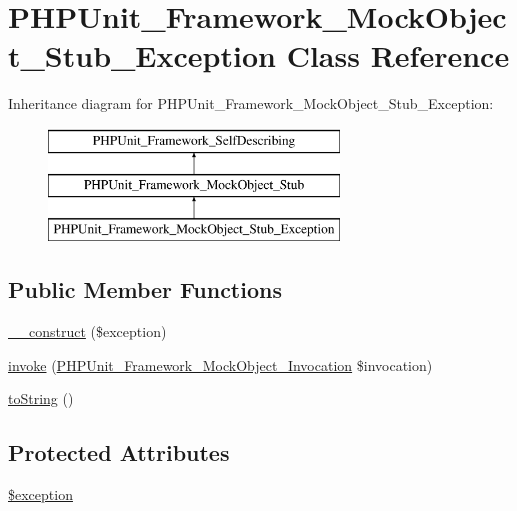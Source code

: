 \hypertarget{class_p_h_p_unit___framework___mock_object___stub___exception}{}\section{P\+H\+P\+Unit\+\_\+\+Framework\+\_\+\+Mock\+Object\+\_\+\+Stub\+\_\+\+Exception Class Reference}
\label{class_p_h_p_unit___framework___mock_object___stub___exception}
Inheritance diagram for P\+H\+P\+Unit\+\_\+\+Framework\+\_\+\+Mock\+Object\+\_\+\+Stub\+\_\+\+Exception\+:\begin{figure}[H]
\begin{center}
\leavevmode
\includegraphics[height=3.000000cm]{class_p_h_p_unit___framework___mock_object___stub___exception}
\end{center}
\end{figure}
\subsection*{Public Member Functions}
\begin{DoxyCompactItemize}
\item 
\mbox{\hyperlink{class_p_h_p_unit___framework___mock_object___stub___exception_a62d6fa9ad1594191d3535672297352ad}{\+\_\+\+\_\+construct}} (\$exception)
\item 
\mbox{\hyperlink{class_p_h_p_unit___framework___mock_object___stub___exception_af2fc26e6704e08d95f2ea1d9c5ffb865}{invoke}} (\mbox{\hyperlink{interface_p_h_p_unit___framework___mock_object___invocation}{P\+H\+P\+Unit\+\_\+\+Framework\+\_\+\+Mock\+Object\+\_\+\+Invocation}} \$invocation)
\item 
\mbox{\hyperlink{class_p_h_p_unit___framework___mock_object___stub___exception_a5558c5d549f41597377fa1ea8a1cefa3}{to\+String}} ()
\end{DoxyCompactItemize}
\subsection*{Protected Attributes}
\begin{DoxyCompactItemize}
\item 
\mbox{\hyperlink{class_p_h_p_unit___framework___mock_object___stub___exception_a7b8c95284212c3072a7a96bd4233eb79}{\$exception}}
\end{DoxyCompactItemize}


